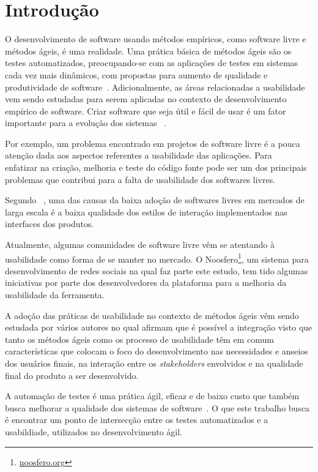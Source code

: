 \chapter{Introdução}

O desenvolvimento de software usando métodos empíricos, como software livre e métodos ágeis, é uma realidade. Uma prática básica de métodos ágeis são os testes automatizados, preocupando-se com as aplicações de testes em sistemas cada vez mais dinâmicos, com propostas para aumento de qualidade e produtividade de software~\cite{vicente2010}.
%
Adicionalmente, as áreas relacionadas a usabilidade vem sendo estudadas para serem aplicadas no contexto de desenvolvimento empírico de software. Criar software que seja útil e fácil de usar é um fator importante para a evolução dos sistemas ~\cite{santos2012}.

Por exemplo, um problema encontrado em projetos de software livre é a pouca atenção dada aos aspectos referentes a usabilidade das aplicações. Para ~ enfatizar na criação, melhoria e teste do código fonte pode ser um dos principais problemas que contribui para a falta de usabilidade dos softwares livres.

%
Segundo ~, uma das causas da baixa adoção de softwares livres em mercados de larga escala é a baixa qualidade dos estilos de interação implementados nas interfaces dos produtos. 

Atualmente, algumas comunidades de software livre vêm se atentando à usabilidade como forma de se manter no mercado. 
%
O Noosfero\footnote{\url{noosfero.org}}, um sistema para desenvolvimento de redes sociais na qual faz parte este estudo, tem tido algumas iniciativas por parte dos desenvolvedores da plataforma para a melhoria da usabilidade da ferramenta. 

A adoção das práticas de usabilidade no contexto de métodos ágeis vêm sendo estudada por vários autores no qual afirmam que é possível a integração visto que tanto os métodos ágeis como os processo de usabilidade têm em comum características que colocam o foco do desenvolvimento nas necessidades e anseios dos usuários finais, na interação entre os \textit{stakeholders} envolvidos e na qualidade final do produto a ser desenvolvido.

A automação de testes é uma prática ágil, eficaz e de baixo custo que também busca melhorar a qualidade dos sistemas de software~\cite{cotter1995}. O que este trabalho busca é encontrar um ponto de intersecção entre os testes automatizados e a usabildiade, utilizados no desenvolvimento ágil.

